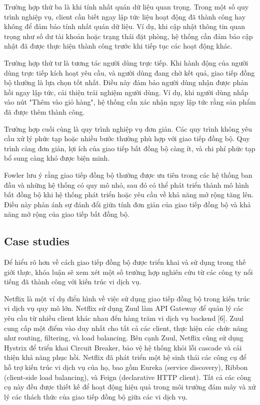 Trường hợp thứ ba là khi tính nhất quán dữ liệu quan trọng. Trong một số quy trình nghiệp vụ, client cần biết ngay lập tức liệu hoạt động đã thành công hay không để đảm bảo tính nhất quán dữ liệu. Ví dụ, khi cập nhật thông tin quan trọng như số dư tài khoản hoặc trạng thái đặt phòng, hệ thống cần đảm bảo cập nhật đã được thực hiện thành công trước khi tiếp tục các hoạt động khác.

Trường hợp thứ tư là tương tác người dùng trực tiếp. Khi hành động của người dùng trực tiếp kích hoạt yêu cầu, và người dùng đang chờ kết quả, giao tiếp đồng bộ thường là lựa chọn tốt nhất. Điều này đảm bảo người dùng nhận được phản hồi ngay lập tức, cải thiện trải nghiệm người dùng. Ví dụ, khi người dùng nhấp vào nút "Thêm vào giỏ hàng", hệ thống cần xác nhận ngay lập tức rằng sản phẩm đã được thêm thành công.

Trường hợp cuối cùng là quy trình nghiệp vụ đơn giản. Các quy trình không yêu cầu xử lý phức tạp hoặc nhiều bước thường phù hợp với giao tiếp đồng bộ. Quy trình càng đơn giản, lợi ích của giao tiếp bất đồng bộ càng ít, và chi phí phức tạp bổ sung càng khó được biện minh.

Fowler \cite{fowler2014} lưu ý rằng giao tiếp đồng bộ thường được ưu tiên trong các hệ thống ban đầu và những hệ thống có quy mô nhỏ, sau đó có thể phát triển thành mô hình bất đồng bộ khi hệ thống phát triển hoặc yêu cầu về khả năng mở rộng tăng lên. Điều này phản ánh sự đánh đổi giữa tính đơn giản của giao tiếp đồng bộ và khả năng mở rộng của giao tiếp bất đồng bộ.

\subsection{Case studies}
Để hiểu rõ hơn về cách giao tiếp đồng bộ được triển khai và sử dụng trong thế giới thực, khóa luận sẽ xem xét một số trường hợp nghiên cứu từ các công ty nổi tiếng đã thành công với kiến trúc vi dịch vụ.

Netflix là một ví dụ điển hình về việc sử dụng giao tiếp đồng bộ trong kiến trúc vi dịch vụ quy mô lớn. Netflix sử dụng Zuul làm API Gateway để quản lý các yêu cầu từ nhiều client khác nhau đến hàng trăm vi dịch vụ backend [6]. Zuul cung cấp một điểm vào duy nhất cho tất cả các client, thực hiện các chức năng như routing, filtering, và load balancing. Bên cạnh Zuul, Netflix cũng sử dụng Hystrix để triển khai Circuit Breaker, bảo vệ hệ thống khỏi lỗi cascade và cải thiện khả năng phục hồi. Netflix đã phát triển một hệ sinh thái các công cụ để hỗ trợ kiến trúc vi dịch vụ của họ, bao gồm Eureka (service discovery), Ribbon (client-side load balancing), và Feign (declarative HTTP client). Tất cả các công cụ này đều được thiết kế để hoạt động hiệu quả trong môi trường đám mây và xử lý các thách thức của giao tiếp đồng bộ giữa các vi dịch vụ.

